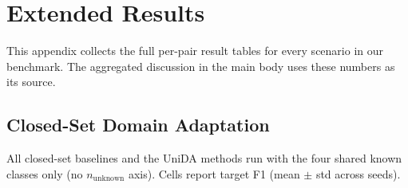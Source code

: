 \section{Extended Results}
\label{sec:extended_results}
This appendix collects the full per-pair result tables for every scenario in our benchmark. The aggregated discussion in the main body uses these numbers as its source.

\subsection{Closed-Set Domain Adaptation}
\label{sec:ext_closed_set}
All closed-set baselines and the UniDA methods run with the four shared known classes only (no $n_{\text{unknown}}$ axis). Cells report target F1 (mean $\pm$ std across seeds).

